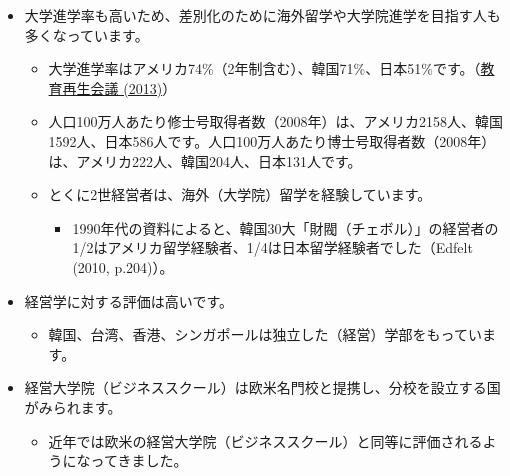 \documentclass[
]{book}
\providecommand{\tightlist}{%
  \setlength{\itemsep}{0pt}\setlength{\parskip}{0pt}}
\begin{document}
\begin{itemize}
\item
  大学進学率も高いため、差別化のために海外留学や大学院進学を目指す人も多くなっています。

  \begin{itemize}
  \item
    大学進学率はアメリカ74\%（2年制含む）、韓国71\%、日本51\%です。（\href{https://www.kantei.go.jp/jp/singi/kyouikusaisei/pdf/dai3_2.pdf}{教育再生会議 (2013)}）
  \item
    人口100万人あたり修士号取得者数（2008年）は、アメリカ2158人、韓国1592人、日本586人です。人口100万人あたり博士号取得者数（2008年）は、アメリカ222人、韓国204人、日本131人です。
  \item
    とくに2世経営者は、海外（大学院）留学を経験しています。

    \begin{itemize}
    \tightlist
    \item
      1990年代の資料によると、韓国30大「財閥（チェボル）」の経営者の1/2はアメリカ留学経験者、1/4は日本留学経験者でした（Edfelt (2010, p.204)）。
    \end{itemize}
  \end{itemize}
\item
  経営学に対する評価は高いです。

  \begin{itemize}
  \tightlist
  \item
    韓国、台湾、香港、シンガポールは独立した（経営）学部をもっています。
  \end{itemize}
\item
  経営大学院（ビジネススクール）は欧米名門校と提携し、分校を設立する国がみられます。

  \begin{itemize}
  \tightlist
  \item
    近年では欧米の経営大学院（ビジネススクール）と同等に評価されるようになってきました。
  \end{itemize}
\end{itemize}
\end{document}
